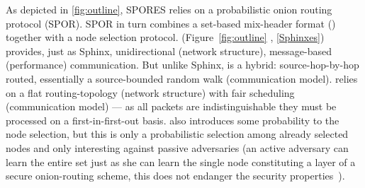 


As depicted in \cref{fig:outline}, \ac{SPORES} relies on a probabilistic onion 
routing protocol (\ac{SPOR}). \Ac{SPOR} in turn combines a set-based mix-header 
format (\Sphinxes) together with a node selection protocol.
\Sphinxes (Figure~\ref{fig:outline} , \cref{Sphinxes}) provides, just 
as \ac{Sphinx}, unidirectional (network structure), message-based (performance) 
communication.
But unlike \ac{Sphinx}, \Sphinxes is a hybrid: source-hop-by-hop routed, 
essentially a source-bounded random walk (communication model).
\Sphinxes relies on a flat routing-topology (network structure) with fair 
scheduling (communication model) --- as all packets are indistinguishable they 
must be processed on a first-in-first-out basis.
\Sphinxes also introduces some probability to the node selection, but this is 
only a probabilistic selection among already selected nodes and only 
interesting against passive adversaries (an active adversary can learn the 
entire set just as she can learn the single node constituting a layer of a
secure onion-routing scheme, this does not endanger the security
properties~\cite{CLOnionRouting}).

